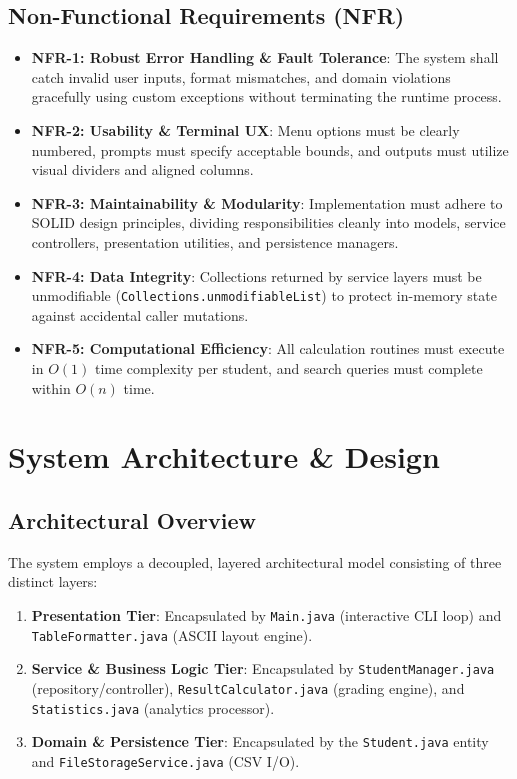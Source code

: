 \documentclass[12pt,a4paper]{report}
\begin{document}
\section{Non-Functional Requirements (NFR)}
\begin{itemize}
    \item \textbf{NFR-1: Robust Error Handling \& Fault Tolerance}: The system shall catch invalid user inputs, format mismatches, and domain violations gracefully using custom exceptions without terminating the runtime process.
    \item \textbf{NFR-2: Usability \& Terminal UX}: Menu options must be clearly numbered, prompts must specify acceptable bounds, and outputs must utilize visual dividers and aligned columns.
    \item \textbf{NFR-3: Maintainability \& Modularity}: Implementation must adhere to SOLID design principles, dividing responsibilities cleanly into models, service controllers, presentation utilities, and persistence managers.
    \item \textbf{NFR-4: Data Integrity}: Collections returned by service layers must be unmodifiable (\texttt{Collections.unmodifiableList}) to protect in-memory state against accidental caller mutations.
    \item \textbf{NFR-5: Computational Efficiency}: All calculation routines must execute in $O(1)$ time complexity per student, and search queries must complete within $O(n)$ time.
\end{itemize}

\chapter{System Architecture \& Design}

\section{Architectural Overview}
The system employs a decoupled, layered architectural model consisting of three distinct layers:
\begin{enumerate}
    \item \textbf{Presentation Tier}: Encapsulated by \texttt{Main.java} (interactive CLI loop) and \texttt{TableFormatter.java} (ASCII layout engine).
    \item \textbf{Service \& Business Logic Tier}: Encapsulated by \texttt{StudentManager.java} (repository/controller), \texttt{ResultCalculator.java} (grading engine), and \texttt{Statistics.java} (analytics processor).
    \item \textbf{Domain \& Persistence Tier}: Encapsulated by the \texttt{Student.java} entity and \texttt{FileStorageService.java} (CSV I/O).
\end{enumerate}
\end{document}
